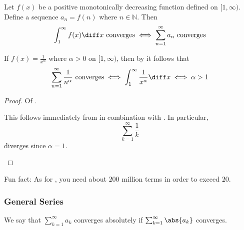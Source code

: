 \begin{thm}\label{thm-integral-test-series}
	Let $f(x)$ be a positive monotonically decreasing function defined on $[1,\infty)$.
	Define a sequence $a_n=f(n)$ where $n\in\mathbb{N}$. Then
	\begin{equation*}
		\int_1^\infty f(x) \diff x \text{ converges} \iff \sum_{n=1}^\infty a_n \text{ converges}
	\end{equation*}
\end{thm}

\begin{crl}\label{crl-integral-test}
	If $f(x)=\tfrac{1}{x^\alpha}$ where $\alpha>0$ on $[1,\infty)$, then by
	 it follows that
	\begin{equation*}
		\sum_{n=1}^\infty \frac{1}{n^\alpha}\text{ converges}
		\iff \int_1^\infty \frac{1}{x^\alpha} \diff x
		\iff \alpha>1
	\end{equation*}
\end{crl}

\begin{proof}\label{proof-divergent-geometric-series}
	Of .
	\begin{flushleft}
		This follows immediately from  in
		combination with . In particular,
		\begin{equation*}
			\sum_{k=1}^\infty \frac{1}{k}
		\end{equation*}
		diverges since $\alpha=1$.
	\end{flushleft}
\end{proof}

\begin{rem}\label{rem-divergent-geometric-series}
	Fun fact: As for , you need
	about $200$ million terms in order to exceed $20$.
\end{rem}

\subsubsection{General Series}\label{subsubsec-general-series}

\begin{definition}\label{def-general-converges-absolutely}
	We say that $\sum_{k=1}^\infty a_k$ converges absolutely if  $\sum_{k=1}^\infty \abs{a_k}$
	converges.
\end{definition}

